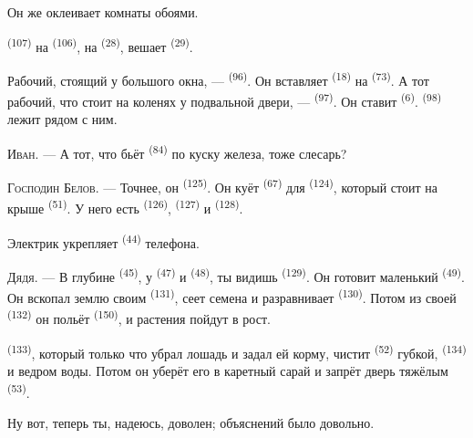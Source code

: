 Он же оклеивает комнаты обоями.

 \textsuperscript{(107)} на  \textsuperscript{(106)},
на  \textsuperscript{(28)}, вешает 
\textsuperscript{(29)}.

Рабочий, стоящий у большого окна, ---  \textsuperscript{(96)}.
Он вставляет  \textsuperscript{(18)} на 
\textsuperscript{(73)}. А тот рабочий, что стоит на коленях у подвальной двери,
---  \textsuperscript{(97)}. Он ставит 
\textsuperscript{(6)}.  \textsuperscript{(98)} лежит рядом с ним.

\textsc{Иван}. --- А тот, что бьёт  \textsuperscript{(84)} по
куску железа, тоже слесарь?

\textsc{Господин Белов}. --- Точнее, он  \textsuperscript{(125)}.
Он куёт  \textsuperscript{(67)} для 
\textsuperscript{(124)}, который стоит на крыше 
\textsuperscript{(51)}. У него есть  \textsuperscript{(126)},
 \textsuperscript{(127)} и  \textsuperscript{(128)}.

Электрик укрепляет  \textsuperscript{(44)} телефона.

\VUsaut{3.0mm}

\textsc{Дядя}. --- В глубине  \textsuperscript{(45)}, у 
\textsuperscript{(47)} и  \textsuperscript{(48)}, ты видишь
 \textsuperscript{(129)}. Он готовит маленький 
\textsuperscript{(49)}. Он вскопал землю своим  \textsuperscript{(131)},
сеет семена и разравнивает  \textsuperscript{(130)}. Потом из
своей  \textsuperscript{(132)} он польёт 
\textsuperscript{(150)}, и растения пойдут в рост.

 \textsuperscript{(133)}, который только что убрал лошадь и задал
ей корму, чистит  \textsuperscript{(52)} губкой,  \textsuperscript{(134)} и ведром воды. Потом он уберёт его в каретный
сарай и запрёт дверь тяжёлым  \textsuperscript{(53)}.

Ну вот, теперь ты, надеюсь, доволен; объяснений было довольно.

